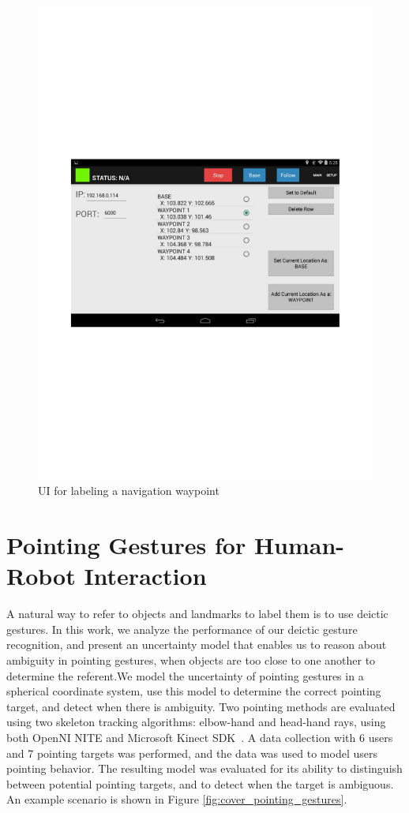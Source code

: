 \documentclass[12pt]{gatech-thesis}
\begin{document}
\begin{figure}[ht!]
\centering
\includegraphics[width=1.0\textwidth]{pics/ui}
\caption{UI for labeling a navigation waypoint}
\label{fig:ui}
\end{figure}

\section{Pointing Gestures for Human-Robot Interaction}
\label{sec:pointing_gestures}

A natural way to refer to objects and landmarks to label them is to use deictic gestures. In this work, we analyze the performance of our deictic gesture recognition, and present an uncertainty model that enables us to reason about ambiguity in pointing gestures, when objects are too close to one another to determine the referent.We model the uncertainty of pointing gestures in a spherical coordinate system, use this model to determine the correct pointing target, and detect when there is ambiguity. Two pointing methods are evaluated using two skeleton tracking algorithms: elbow-hand and head-hand rays, using both OpenNI NITE and Microsoft Kinect SDK~\cite{shotton2011real}.  A data collection with 6 users and 7 pointing targets was performed, and the data was used to model users pointing behavior.  The resulting model was evaluated for its ability to distinguish between potential pointing targets, and to detect when the target is ambiguous.  An example scenario is shown in Figure \ref{fig:cover_pointing_gestures}.
\end{document}
